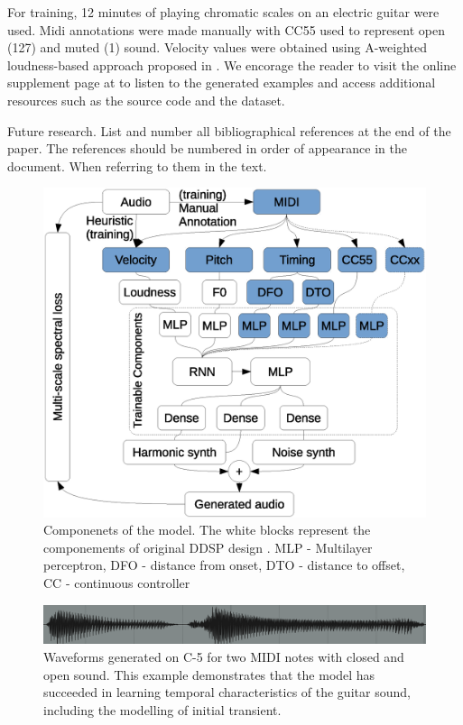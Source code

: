 \documentclass{article}
\begin{document}
\begin{sloppy}
For training, 12 minutes of playing chromatic scales on an electric guitar  were used. Midi annotations were made manually with CC55 used to represent open (127) and muted (1) sound. Velocity values were obtained using A-weighted loudness-based approach proposed in \cite{control-synthesis}. We encorage the reader to visit the online supplement page at  to listen to the generated examples and access additional resources such as the source code and the dataset.

Future research. List and number all bibliographical references at the end of the paper. The references should be numbered in order of appearance in the document. When referring to them in the text.

\begin{figure}[t]
  \centering
  \centerline{\includegraphics[scale=0.4]{components}}
  \caption{Componenets of the model. The white blocks represent the componements of original DDSP design \cite{ddsp}. 
MLP - Multilayer perceptron, 
DFO - distance from onset, 
DTO - distance to offset,
CC - continuous controller
}
  \label{fig:components}
\end{figure}

\begin{figure}[t]
  \centering
  \centerline{\includegraphics[scale=0.32]{generated_waveform}}
  \caption{Waveforms generated on C-5 for \cite{ddsp} two MIDI notes with closed and open sound. This example demonstrates that the model has succeeded in learning temporal characteristics of the guitar sound, including the modelling of initial transient.}
  \label{fig:generated_waveform}
\end{figure}





\end{sloppy}
\end{document}
